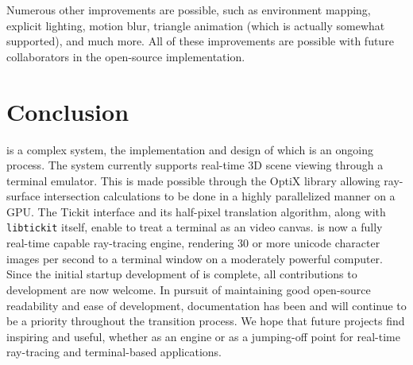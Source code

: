 Numerous other improvements are possible, such as environment mapping, explicit lighting, motion blur, triangle animation (which is actually somewhat supported), and much more.
All of these improvements are possible with future collaborators in the open-source \name{} implementation.

\section{Conclusion}\label{ch:conclusion:end}

\name{} is a complex system, the implementation and design of which is an ongoing process.
The system currently supports real-time 3D scene viewing through a terminal emulator.
This is made possible through the OptiX library allowing ray-surface intersection calculations to be done in a highly parallelized manner on a GPU.
The Tickit interface and its half-pixel translation algorithm, along with \texttt{libtickit} itself, enable \name{} to treat a terminal as an video canvas.
\name{} is now a fully real-time capable ray-tracing engine, rendering 30 or more unicode character images per second to a terminal window on a moderately powerful computer.
Since the initial startup development of \name{} is complete, all contributions to \name{} development are now welcome.
In pursuit of maintaining good open-source readability and ease of development, documentation has been and will continue to be a priority throughout the transition process.
We hope that future projects find \name{} inspiring and useful, whether as an engine or as a jumping-off point for real-time ray-tracing and terminal-based applications.

